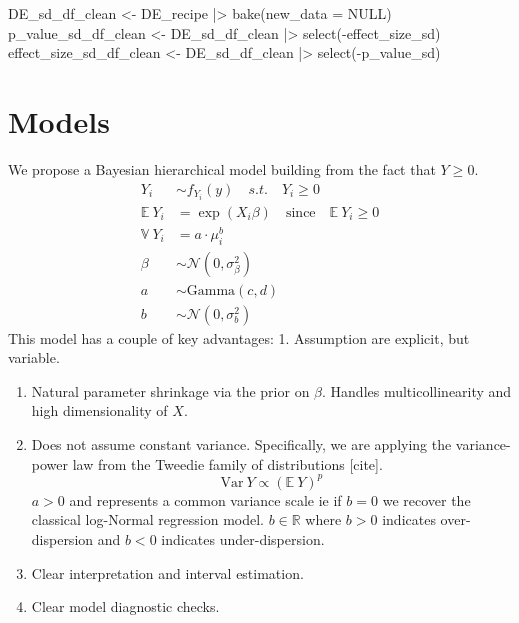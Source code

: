\documentclass[
  letterpaper,
]{article}
\newenvironment{Shaded}{\begin{snugshade}}{\end{snugshade}}
\newcommand{\AttributeTok}[1]{\textcolor[rgb]{0.40,0.45,0.13}{#1}}
\newcommand{\ConstantTok}[1]{\textcolor[rgb]{0.56,0.35,0.01}{#1}}
\newcommand{\FunctionTok}[1]{\textcolor[rgb]{0.28,0.35,0.67}{#1}}
\newcommand{\NormalTok}[1]{\textcolor[rgb]{0.00,0.23,0.31}{#1}}
\newcommand{\OtherTok}[1]{\textcolor[rgb]{0.00,0.23,0.31}{#1}}
\newcommand{\SpecialCharTok}[1]{\textcolor[rgb]{0.37,0.37,0.37}{#1}}
\begin{document}
\begin{Shaded}
\begin{Highlighting}[]
\NormalTok{DE\_sd\_df\_clean }\OtherTok{\textless{}{-}}\NormalTok{ DE\_recipe }\SpecialCharTok{|\textgreater{}} \FunctionTok{bake}\NormalTok{(}\AttributeTok{new\_data =} \ConstantTok{NULL}\NormalTok{)}
\NormalTok{p\_value\_sd\_df\_clean }\OtherTok{\textless{}{-}}\NormalTok{ DE\_sd\_df\_clean }\SpecialCharTok{|\textgreater{}} \FunctionTok{select}\NormalTok{(}\SpecialCharTok{{-}}\NormalTok{effect\_size\_sd)}
\NormalTok{effect\_size\_sd\_df\_clean }\OtherTok{\textless{}{-}}\NormalTok{ DE\_sd\_df\_clean }\SpecialCharTok{|\textgreater{}} \FunctionTok{select}\NormalTok{(}\SpecialCharTok{{-}}\NormalTok{p\_value\_sd)}
\end{Highlighting}
\end{Shaded}

\section{Models}\label{models}

We propose a Bayesian hierarchical model building from the fact that
\(Y \geq 0\). \begin{equation}
\begin{aligned} 
    Y_i &\sim f_{Y_i}(y) \quad s.t. \quad Y_i \geq 0 \\ 
    \mathbb{E} \ Y_i &= \exp(X_i \beta) 
        \quad \text{since} \quad \mathbb{E} \ Y_i \geq 0 \\ 
    \mathbb{V} \ Y_i &= a \cdot \mu_i^b \\
    \beta &\sim \mathcal{N}(0, \sigma^2_\beta) \\
    a &\sim \text{Gamma}(c, d) \\ 
    b &\sim \mathcal{N}(0, \sigma^2_b)
\end{aligned}
\end{equation} This model has a couple of key advantages: 1. Assumption
are explicit, but variable.

\begin{enumerate}
\def\labelenumi{\arabic{enumi}.}
\item
  Natural parameter shrinkage via the prior on \(\beta\). Handles
  multicollinearity and high dimensionality of \(X\).
\item
  Does not assume constant variance. Specifically, we are applying the
  variance-power law from the Tweedie family of distributions
  {[}cite{]}. \begin{equation}
   \text{Var} \ Y \propto (\mathbb{E} \ Y)^p 
  \end{equation} \(a > 0\) and represents a common variance scale ie if
  \(b = 0\) we recover the classical log-Normal regression model.
  \(b \in \mathbb{R}\) where \(b > 0\) indicates over-dispersion and
  \(b < 0\) indicates under-dispersion.
\item
  Clear interpretation and interval estimation.
\item
  Clear model diagnostic checks.
\end{enumerate}
\end{document}
